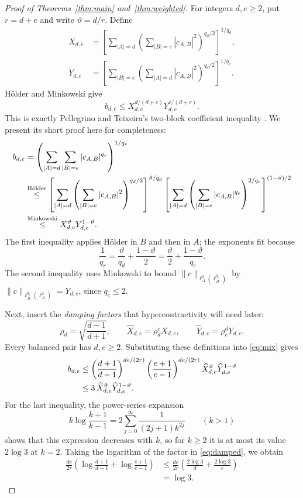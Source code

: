 \documentclass[11pt]{amsart}
\theoremstyle{remark}
\numberwithin{equation}{section}
\begin{document}
\begin{proof}[Proof of Theorems~\ref{thm:main} and~\ref{thm:weighted}]
For integers $d,e\ge2$, put $r=d+e$ and write $\vartheta=d/r$. Define
\[
\begin{aligned}
X_{d,e}&=\left[
\sum_{|A|=d}\left(\sum_{|B|=e}|c_{A,B}|^2\right)^{q_d/2}
\right]^{1/q_d},\\
Y_{d,e}&=\left[
\sum_{|B|=e}\left(\sum_{|A|=d}|c_{A,B}|^2\right)^{q_e/2}
\right]^{1/q_e}.
\end{aligned}
\]
H\"older and Minkowski give
\[
b_{d,e}\le X_{d,e}^{d/(d+e)}Y_{d,e}^{e/(d+e)}.
\]
This is exactly Pellegrino and Teixeira's two-block coefficient inequality
\cite[Lemma~3.4]{PT26}. We present its short proof here for completeness:
\begin{align}
b_{d,e}&=\left(\sum_{|A|=d}\sum_{|B|=e}|c_{A,B}|^{q_r}\right)^{1/q_r}\notag\\
&\overset{\text{H\"older}}{\le}
\left[\sum_{|A|=d}\left(\sum_{|B|=e}|c_{A,B}|^2\right)^{q_d/2}\right]^{\vartheta/q_d}
\left[\sum_{|A|=d}\left(\sum_{|B|=e}|c_{A,B}|^{q_e}\right)^{2/q_e}\right]^{(1-\vartheta)/2}\notag\\
&\overset{\text{Minkowski}}{\le}X_{d,e}^{\vartheta}Y_{d,e}^{1-\vartheta}.
\label{eq:mix}
\end{align}
The first inequality applies H\"older in $B$ and then in $A$; the exponents
fit because
\[
\frac1{q_r}=\frac{\vartheta}{q_d}+\frac{1-\vartheta}{2}
=\frac{\vartheta}{2}+\frac{1-\vartheta}{q_e}.
\]
The second inequality uses Minkowski to bound
$\|c\|_{\ell_A^2(\ell_B^{q_e})}$ by
$\|c\|_{\ell_B^{q_e}(\ell_A^2)}=Y_{d,e}$, since $q_e\le2$.

Next, insert the \emph{damping factors} that hypercontractivity will need
later:
\[
\rho_d=\sqrt{\frac{d-1}{d+1}},\qquad
\widehat X_{d,e}=\rho_d^eX_{d,e},\qquad
\widehat Y_{d,e}=\rho_e^dY_{d,e}.
\]
Every balanced pair has $d,e\ge2$. Substituting these definitions into
\eqref{eq:mix} gives
\begin{align}
b_{d,e}&\le
\left(\frac{d+1}{d-1}\right)^{de/(2r)}
\left(\frac{e+1}{e-1}\right)^{de/(2r)}
\widehat X_{d,e}^{\vartheta}\widehat Y_{d,e}^{1-\vartheta}\notag\\
&\le3\,\widehat X_{d,e}^{\vartheta}\widehat Y_{d,e}^{1-\vartheta}.
\label{eq:damped}
\end{align}
For the last inequality, the power-series expansion
\[
k\log\frac{k+1}{k-1}
=2\sum_{j=0}^{\infty}\frac{1}{(2j+1)k^{2j}}
\qquad(k>1)
\]
shows that this expression decreases with $k$, so for $k\ge2$ it is at most
its value $2\log3$ at $k=2$. Taking the logarithm of the factor in
\eqref{eq:damped}, we obtain
\[
\begin{aligned}
\frac{de}{2r}\left(\log\frac{d+1}{d-1}+\log\frac{e+1}{e-1}\right)
&\le\frac{de}{2r}\left(\frac{2\log3}{d}+\frac{2\log3}{e}\right)\\
&=\log3.
\end{aligned}
\]


\end{proof}
\end{document}

